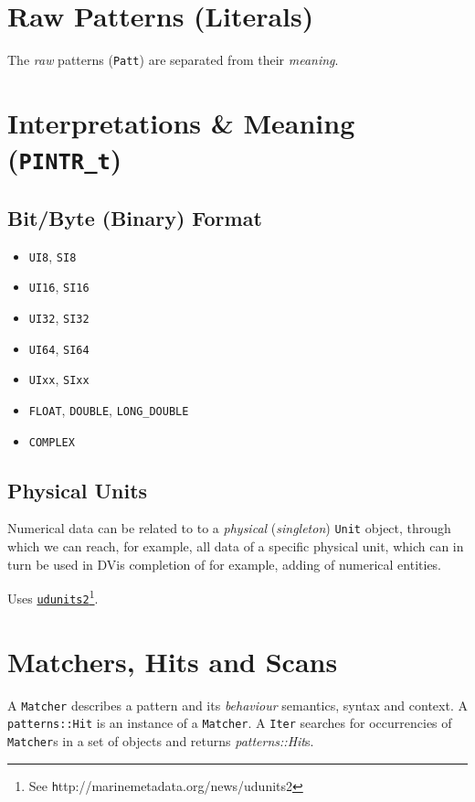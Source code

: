 \documentclass[a4paper,10pt,twocolumn]{article}
\newcommand{\codeCxxClass}[1]{\lstset{language=C++}\lstinline!#1!}
\newcommand{\hrefn}[2]{\href{#1}{#2}\footnote{See {\texttt #1}}} %
\begin{document}
\section{Raw Patterns (Literals)}

The \emph{raw} patterns (\codeCxxClass{Patt}) are separated from their
\emph{meaning}.

\section{Interpretations \& Meaning (\texttt{PINTR_t})}

\subsection{Bit/Byte (Binary) Format}

\begin{itemize}
\item \texttt{UI8}, \texttt{SI8}
\item \texttt{UI16}, \texttt{SI16}
\item \texttt{UI32}, \texttt{SI32}
\item \texttt{UI64}, \texttt{SI64}
\item \texttt{UIxx}, \texttt{SIxx}
\item \texttt{FLOAT}, \texttt{DOUBLE}, \texttt{LONG_DOUBLE}
\item \texttt{COMPLEX}
\end{itemize}

\subsection{Physical Units}

Numerical data can be related to to a \emph{physical} (\emph{singleton})
\codeCxxClass{Unit} object, through which we can reach, for example, all data of a
specific physical unit, which can in turn be used in DVis completion of for
example, adding of numerical entities.

Uses \hrefn{http://marinemetadata.org/news/udunits2}{\texttt{udunits2}}.

\section{Matchers, Hits and Scans}

A \codeCxxClass{Matcher} describes a pattern and its \emph{behaviour} semantics,
syntax and context. A \texttt{patterns::Hit} is an instance of a \codeCxxClass{Matcher}. A
\codeCxxClass{Iter} searches for occurrencies of \codeCxxClass{Matcher}s in a set of
objects and returns \emph{patterns::Hit}s.
\end{document}
